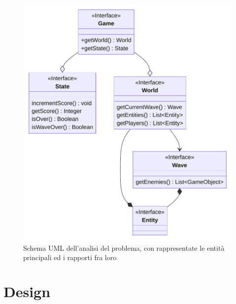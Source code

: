 \documentclass[a4paper,12pt]{report}
\begin{document}
\begin{figure}[H]
\centering{}
\includegraphics[width=1\textwidth]{img/AnalysisDomainUML-1.pdf}
\caption{Schema UML dell'analisi del problema, con rappresentate le entità principali ed i rapporti fra loro}
\label{img:analysis}
\end{figure}




\chapter{Design}
\end{document}
